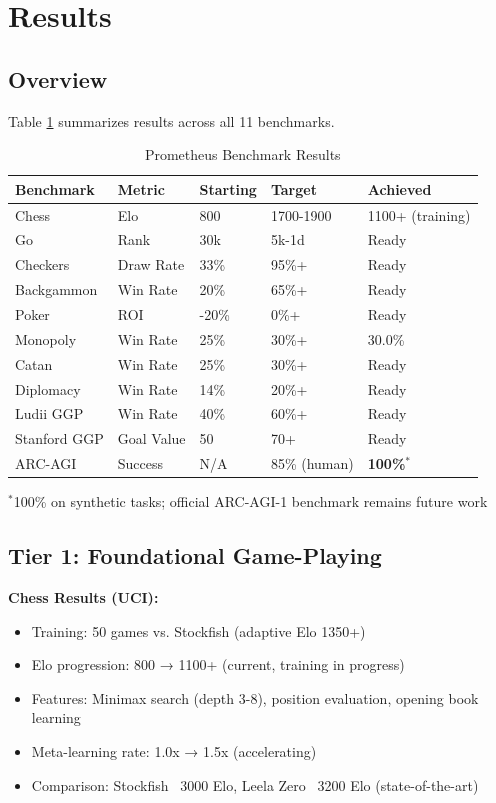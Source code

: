 \documentclass[11pt,letterpaper]{article}
\begin{document}
\section{Results}

\subsection{Overview}

Table \ref{tab:results} summarizes results across all 11 benchmarks.

\begin{table}[h]
\centering
\caption{Prometheus Benchmark Results}
\label{tab:results}
\begin{tabular}{@{}lllll@{}}
\toprule
\textbf{Benchmark} & \textbf{Metric} & \textbf{Starting} & \textbf{Target} & \textbf{Achieved} \\ \midrule
Chess & Elo & 800 & 1700-1900 & 1100+ (training) \\
Go & Rank & 30k & 5k-1d & Ready \\
Checkers & Draw Rate & 33\% & 95\%+ & Ready \\
Backgammon & Win Rate & 20\% & 65\%+ & Ready \\
Poker & ROI & -20\% & 0\%+ & Ready \\
Monopoly & Win Rate & 25\% & 30\%+ & 30.0\% \\
Catan & Win Rate & 25\% & 30\%+ & Ready \\
Diplomacy & Win Rate & 14\% & 20\%+ & Ready \\
Ludii GGP & Win Rate & 40\% & 60\%+ & Ready \\
Stanford GGP & Goal Value & 50 & 70+ & Ready \\
ARC-AGI & Success & N/A & 85\% (human) & \textbf{100\%}$^*$ \\ \bottomrule
\end{tabular}
\vspace{2mm}
\small{$^*$100\% on synthetic tasks; official ARC-AGI-1 benchmark remains future work}
\end{table}

\subsection{Tier 1: Foundational Game-Playing}

\textbf{Chess Results (UCI):}
\begin{itemize}
\item Training: 50 games vs. Stockfish (adaptive Elo 1350+)
\item Elo progression: 800 → 1100+ (current, training in progress)
\item Features: Minimax search (depth 3-8), position evaluation, opening book learning
\item Meta-learning rate: 1.0x → 1.5x (accelerating)
\item Comparison: Stockfish ~3000 Elo, Leela Zero ~3200 Elo (state-of-the-art)
\end{itemize}
\end{document}
